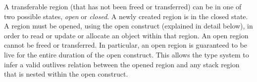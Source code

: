 A transferable region (that has not been freed or transferred) can be in one of two possible
states, \emph{open} or \emph{closed}. A newly created region is in the closed state.
A region must be opened, using the open construct (explained in detail below), in order
to read or update or allocate an object within that region.
An open region cannot be freed or transferred. 
In particular, an open region is guaranteed to be live for the entire duration of the open construct.
This allows the type system to infer a valid outlives relation between the opened region
and any stack region that is nested within the open construct.

